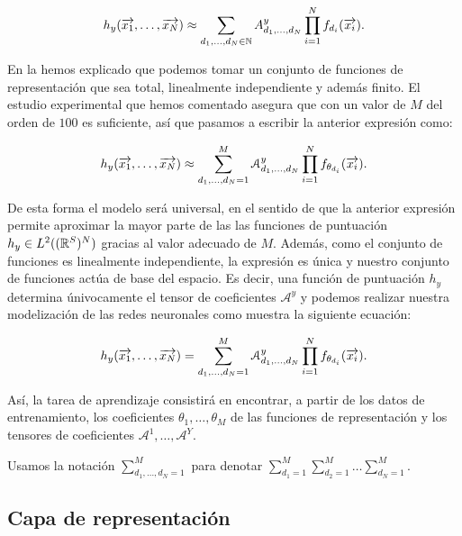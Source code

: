 \begin{equation} \label{eq:hipotesis_en_general}
	h_y(\overrightarrow{x_1}, \ldots, \overrightarrow{x_N}) \approx \sum_{d_1, \ldots, d_N \in \mathbb{N}} A^y_{d_1, \ldots, d_N} \prod_{i = 1}^N f_{d_i}(\overrightarrow{x_i}).
\end{equation}

En la  hemos explicado que podemos tomar un conjunto de funciones de representación que sea total, linealmente independiente y además finito. El estudio experimental que hemos comentado asegura que con un valor de $M$ del orden de $100$ es suficiente, así que pasamos a escribir la anterior expresión como:

\begin{equation}
	h_y(\overrightarrow{x_1}, \ldots, \overrightarrow{x_N}) \approx \sum_{d_1, \ldots, d_N = 1}^{M} \mathcal{A}^y_{d_1, \ldots, d_N} \prod_{i = 1}^N f_{\theta_{d_i}}(\overrightarrow{x_i}).
\end{equation}

De esta forma el modelo será universal, en el sentido de que la anterior expresión permite aproximar la mayor parte de las las funciones de puntuación $h_y \in L^2((\mathbb{R}^S)^N)$ gracias al valor adecuado de $M$. Además, como el conjunto de funciones es linealmente independiente, la expresión es única y nuestro conjunto de funciones actúa de base del espacio. Es decir, una función de puntuación $h_y$ determina únivocamente el tensor de coeficientes $\mathcal{A}^y$ y podemos realizar nuestra modelización de las redes neuronales como muestra la siguiente ecuación:

\begin{equation} \label{eq:puntuacion_general}
	h_y(\overrightarrow{x_1}, \ldots, \overrightarrow{x_N}) = \sum_{d_1, \ldots, d_N = 1}^{M} \mathcal{A}^y_{d_1, \ldots, d_N} \prod_{i = 1}^N f_{\theta_{d_i}}(\overrightarrow{x_i}).
\end{equation}

Así, la tarea de aprendizaje consistirá en encontrar, a partir de los datos de entrenamiento, los coeficientes $\theta_1, \ldots, \theta_M$ de las funciones de representación y los tensores de coeficientes $\mathcal{A}^1, \ldots, \mathcal{A}^Y$.

\begin{observacion}
	Usamos la notación $\sum_{d_1, \ldots, d_N = 1}^{M}$ para denotar $\sum_{d_1 = 1}^{M} \sum_{d_2 = 1}^{M} \ldots \sum_{d_N = 1}^{M}$.
\end{observacion}

\subsection{Capa de representación} \label{subs:capa_de_representacion}

